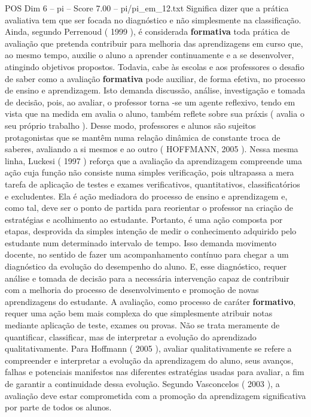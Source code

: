 \begin{textsample}{POS Dim 6 – pi – Score 7.00 – pi/pi\_em\_12.txt}
Significa dizer que a prática avaliativa tem que ser focada no diagnóstico e não simplesmente na classificação.
Ainda, segundo Perrenoud ( 1999 ), é considerada \textbf{formativa} toda prática de avaliação que pretenda contribuir para melhoria das aprendizagens em curso que, ao mesmo tempo, auxilie o aluno a aprender continuamente e a se desenvolver, atingindo objetivos propostos.
Todavia, cabe às escolas e aos professores o desafio de saber como a avaliação \textbf{formativa} pode auxiliar, de forma efetiva, no processo de ensino e aprendizagem.
Isto demanda discussão, análise, investigação e tomada de decisão, pois, ao avaliar, o professor torna -se um agente reflexivo, tendo em vista que na medida em avalia o aluno, também reflete sobre sua práxis ( avalia o seu próprio trabalho ).
Desse modo, professores e alunos são sujeitos protagonistas que se mantêm numa relação dinâmica de constante troca de saberes, avaliando a si mesmos e ao outro ( HOFFMANN, 2005 ).
Nessa mesma linha, Luckesi ( 1997 ) reforça que a avaliação da aprendizagem compreende uma ação cuja função não consiste numa simples verificação, pois ultrapassa a mera tarefa de aplicação de testes e exames verificativos, quantitativos, classificatórios e excludentes.
Ela é ação mediadora do processo de ensino e aprendizagem e, como tal, deve ser o ponto de partida para reorientar o professor na criação de estratégias e acolhimento ao estudante.
Portanto, é uma ação composta por etapas, desprovida da simples intenção de medir o conhecimento adquirido pelo estudante num determinado intervalo de tempo.
Isso demanda movimento docente, no sentido de fazer um acompanhamento contínuo para chegar a um diagnóstico da evolução do desempenho do aluno.
E, esse diagnóstico, requer análise e tomada de decisão para a necessária intervenção capaz de contribuir com a melhoria do processo de desenvolvimento e promoção de novas aprendizagens do estudante.
A avaliação, como processo de caráter \textbf{formativo}, requer uma ação bem mais complexa do que simplesmente atribuir notas mediante aplicação de teste, exames ou provas.
Não se trata meramente de quantificar, classificar, mas de interpretar a evolução do aprendizado qualitativamente.
Para Hoffmann ( 2005 ), avaliar qualitativamente se refere a compreender e interpretar a evolução da aprendizagem do aluno, seus avanços, falhas e potenciais manifestos nas diferentes estratégias usadas para avaliar, a fim de garantir a continuidade dessa evolução.
Segundo Vasconcelos ( 2003 ), a avaliação deve estar comprometida com a promoção da aprendizagem significativa por parte de todos os alunos.

\end{textsample}
